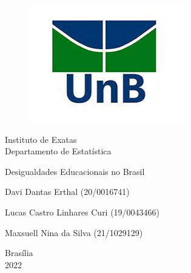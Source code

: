 \documentclass[a4paper, 12pt]{article} %
\begin{document}
\begin{titlepage}
\center

\begin{figure}[H]
\cantering
\center
\includegraphics[scale=1]{figuras/unb1.jpg}
\end{figure}
\large
Instituto de Exatas\\
Departamento de Estatística\\

\vspace{3cm}

{\fontsize{16}{18}\selectfont Desigualdades Educacionais no Brasil
}\\[0.4cm]

\vspace{3cm}

Davi Dantas Erthal (20/0016741)

Lucas Castro Linhares Curi (19/0043466)

Maxsuell Nina da Silva (21/1029129)




\vspace{3cm}




Brasília\\
2022

\vfill
\end{titlepage}




\end{document}
